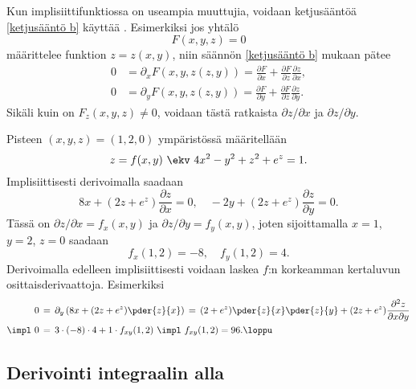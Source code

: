 Kun implisiittifunktiossa on useampia muuttujia, voidaan ketjusääntöä \eqref{ketjusääntö b} 
käyttää . Esimerkiksi jos yhtälö
\[
F(x,y,z)=0
\]
määrittelee funktion $z=z(x,y)$, niin säännön \eqref{ketjusääntö b} mukaan pätee
\begin{align*}
0 &= \partial_x F(x,y,z(z,y))=\frac{\partial F}{\partial x} + \frac{\partial F}{\partial z}
\frac{\partial z}{\partial x}, \\
0 &= \partial_y F(x,y,z(z,y))=\frac{\partial F}{\partial y} + \frac{\partial F}{\partial z}
\frac{\partial z}{\partial y}.
\end{align*}
Sikäli kuin on $F_z(x,y,z) \neq 0$, voidaan tästä ratkaista $\partial z/\partial x$ ja
$\partial z/\partial y$.
\begin{Exa} Pisteen $(x,y,z)=(1,2,0)$ ympäristössä määritellään
\[
z=f(x,y) \ \ekv \ 4x^2-y^2+z^2+e^z=1.
\]
Implisiittisesti derivoimalla saadaan
\[
8x+(2z+e^z)\frac{\partial z}{\partial x} = 0,\quad 
-2y+(2z+e^z)\frac{\partial z}{\partial y} = 0.
\]
Tässä on $\partial z / \partial x = f_x(x,y)$ ja $\partial z / \partial y = f_y(x,y)$, joten 
sijoittamalla $x=1$, $y=2$, $z=0$ saadaan
\[
f_x(1,2)=-8,\quad f_y(1,2)=4.
\]
Derivoimalla edelleen implisiittisesti voidaan laskea $f$:n korkeamman kertaluvun 
osittaisderivaattoja. Esimerkiksi
\begin{align*}
0\,&=\,\partial_y\left(8x+(2z+e^z)\pder{z}{x}\right)\,
    =\,(2+e^z)\pder{z}{x}\pder{z}{y}+(2z+e^z)\frac{\partial^2 z}{\partial x \partial y} \\
\impl\ 
    0\,&=\,3\cdot(-8)\cdot 4 + 1\cdot f_{xy}(1,2)\ \impl\ f_{xy}(1,2)= 96. \loppu
\end{align*}
\end{Exa}

\subsection*{Derivointi integraalin alla}

